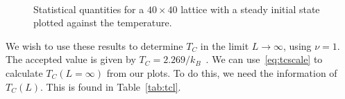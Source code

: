 \documentclass[12pt]{article}
\numberwithin{equation}{section}
\begin{document}
\begin{figure}[h]
\begin{center}
 \\
\caption{Statistical quantities for a $40\times40$ lattice with a steady initial state plotted against the temperature.}
\label{fig:latsize40}
\end{center}
\end{figure}

\par We wish to use these results to determine $T_{C}$ in the limit $L\rightarrow\infty$, using $\nu=1$.  The accepted value is given by $T_{C}=2.269/k_{B}$~\cite{lecture}.    We can use~\eqref{eq:tcscale} to calculate $T_{C}(L=\infty)$ from our plots.  To do this, we need the information of $T_{C}(L)$.  This is found in Table~\ref{tab:tcl}. 
\end{document}
